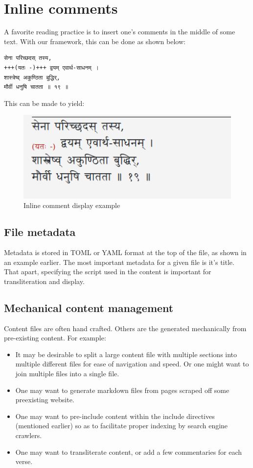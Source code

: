 \documentclass[11pt]{article}
\begin{document}
\section{Inline comments}
A favorite reading practice is to insert one's comments in the middle of some text. With our framework, this can be done as shown below:

\begin{verbatim}
सेना परिच्छदस् तस्य,  
+++(यतः -)+++ द्वयम् एवार्थ-साधनम् ।  
शास्त्रेष्व् अकुण्ठिता बुद्धिर्,  
मौर्वी धनुषि चातता ॥ १९ ॥   
\end{verbatim}

This can be made to yield:


\begin{figure}[h]
\caption{Inline comment display example}
\centering
\includegraphics[width=1.0\textwidth]{images/inline-comment-example}
\end{figure}


\subsection{File metadata}
Metadata is stored in TOML or YAML format at the top of the file, as shown in an example earlier. The most important metadata for a given file is it's title. That apart, specifying the script used in the content is important for transliteration and display.

\subsection{Mechanical content management}
Content files are often hand crafted. Others are the generated mechanically from pre-existing content. For example: 

\begin{itemize}
\tightlist
\item
  It may be desirable to split a large content file with multiple sections into multiple different files for ease of navigation and speed. Or one might want to join multiple files into a single file.
\item
  One may want to generate markdown files from pages scraped off some preexisting website.
\item
  One may want to pre-include content within the include directives (mentioned earlier) so as to facilitate proper indexing by search engine crawlers.
\item
  One may want to transliterate content, or add a few commentaries for each verse.
\end{itemize}
\end{document}
